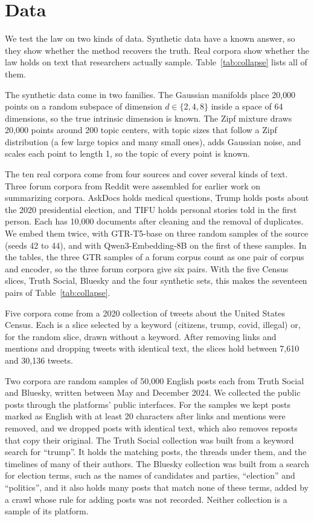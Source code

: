 \section{Data}
\label{sec:data}

We test the law on two kinds of data. Synthetic data have a known answer, so they show whether the method recovers the truth. Real corpora show whether the law holds on text that researchers actually sample. Table~\ref{tab:collapse} lists all of them.

The synthetic data come in two families. The Gaussian manifolds place 20{,}000 points on a random subspace of dimension $d \in \{2, 4, 8\}$ inside a space of 64 dimensions, so the true intrinsic dimension is known. The Zipf mixture draws 20{,}000 points around 200 topic centers, with topic sizes that follow a Zipf distribution (a few large topics and many small ones), adds Gaussian noise, and scales each point to length 1, so the topic of every point is known.

The ten real corpora come from four sources and cover several kinds of text. Three forum corpora from Reddit were assembled for earlier work on summarizing corpora. AskDocs holds medical questions, Trump holds posts about the 2020 presidential election, and TIFU holds personal stories told in the first person. Each has 10{,}000 documents after cleaning and the removal of duplicates. We embed them twice, with GTR-T5-base \citep{ni2022gtr} on three random samples of the source (seeds 42 to 44), and with Qwen3-Embedding-8B \citep{qwen3embedding2025} on the first of these samples. In the tables, the three GTR samples of a forum corpus count as one pair of corpus and encoder, so the three forum corpora give six pairs. With the five Census slices, Truth Social, Bluesky and the four synthetic sets, this makes the seventeen pairs of Table~\ref{tab:collapse}.

Five corpora come from a 2020 collection of tweets about the United States Census. Each is a slice selected by a keyword (citizens, trump, covid, illegal) or, for the random slice, drawn without a keyword. After removing links and mentions and dropping tweets with identical text, the slices hold between 7{,}610 and 30{,}136 tweets.

Two corpora are random samples of 50{,}000 English posts each from Truth Social and Bluesky, written between May and December 2024. We collected the public posts through the platforms' public interfaces. For the samples we kept posts marked as English with at least 20 characters after links and mentions were removed, and we dropped posts with identical text, which also removes reposts that copy their original. The Truth Social collection was built from a keyword search for ``trump''. It holds the matching posts, the threads under them, and the timelines of many of their authors. The Bluesky collection was built from a search for election terms, such as the names of candidates and parties, ``election'' and ``politics'', and it also holds many posts that match none of these terms, added by a crawl whose rule for adding posts was not recorded. Neither collection is a sample of its platform.

